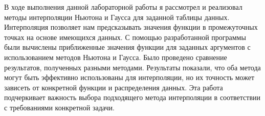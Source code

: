 \documentclass[12pt]{article}
\begin{document}
В ходе выполнения данной лабораторной работы я рассмотрел и реализовал методы интерполяции Ньютона и Гаусса для заданной таблицы данных. Интерполяция позволяет нам предсказывать значения функции в промежуточных точках на основе имеющихся данных.
С помощью разработанной программы были вычислены приближенные значения функции для заданных аргументов с использованием методов Ньютона и Гаусса. Было проведено сравнение результатов, полученных разными методами.
Результаты показали, что оба метода могут быть эффективно использованы для интерполяции, но их точность может зависеть от конкретной функции и распределения данных. Эта работа подчеркивает важность выбора подходящего метода интерполяции в соответствии с требованиями конкретной задачи.
\end{document}
